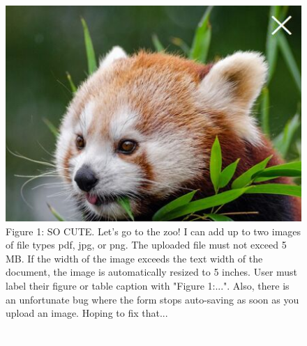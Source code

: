 \documentclass[12pt]{article}
\begin{document}
\begin{figure}[H]
   \centering
   \includegraphics[max width=\textwidth]{redpanda.jpg}
   \caption{Figure 1: SO CUTE. Let's go to the zoo! I can add up to two images of file types pdf, jpg, or png. The uploaded file must not exceed 5 MB. If the width of the image exceeds the text width of the document, the image is automatically resized to 5 inches. User must label their figure or table caption with "Figure 1:...". Also, there is an unfortunate bug where the form stops auto-saving as soon as you upload an image. Hoping to fix that...}
\end{figure}

\begin{figure}[H]
   \centering
   \includegraphics[max width=\textwidth]{Default.png}
   \caption{ }
\end{figure}
\end{document}
